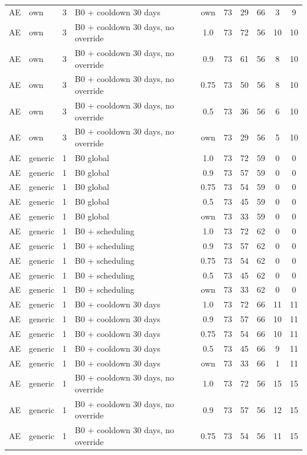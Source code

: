 \documentclass[10pt,onecolumn,letterpaper]{article}
\begin{document}
\begin{longtable}{lllp{4.4cm}cccccc}
AE & own & 3 & B0 + cooldown 30 days & own & 73 & 29 & 66 & 3 & 9 \\
AE & own & 3 & B0 + cooldown 30 days, no override & 1.0 & 73 & 72 & 56 & 10 & 10 \\
AE & own & 3 & B0 + cooldown 30 days, no override & 0.9 & 73 & 61 & 56 & 8 & 10 \\
AE & own & 3 & B0 + cooldown 30 days, no override & 0.75 & 73 & 50 & 56 & 8 & 10 \\
AE & own & 3 & B0 + cooldown 30 days, no override & 0.5 & 73 & 36 & 56 & 6 & 10 \\
AE & own & 3 & B0 + cooldown 30 days, no override & own & 73 & 29 & 56 & 5 & 10 \\
AE & generic & 1 & B0 global & 1.0 & 73 & 72 & 59 & 0 & 0 \\
AE & generic & 1 & B0 global & 0.9 & 73 & 57 & 59 & 0 & 0 \\
AE & generic & 1 & B0 global & 0.75 & 73 & 54 & 59 & 0 & 0 \\
AE & generic & 1 & B0 global & 0.5 & 73 & 45 & 59 & 0 & 0 \\
AE & generic & 1 & B0 global & own & 73 & 33 & 59 & 0 & 0 \\
AE & generic & 1 & B0 + scheduling & 1.0 & 73 & 72 & 62 & 0 & 0 \\
AE & generic & 1 & B0 + scheduling & 0.9 & 73 & 57 & 62 & 0 & 0 \\
AE & generic & 1 & B0 + scheduling & 0.75 & 73 & 54 & 62 & 0 & 0 \\
AE & generic & 1 & B0 + scheduling & 0.5 & 73 & 45 & 62 & 0 & 0 \\
AE & generic & 1 & B0 + scheduling & own & 73 & 33 & 62 & 0 & 0 \\
AE & generic & 1 & B0 + cooldown 30 days & 1.0 & 73 & 72 & 66 & 11 & 11 \\
AE & generic & 1 & B0 + cooldown 30 days & 0.9 & 73 & 57 & 66 & 10 & 11 \\
AE & generic & 1 & B0 + cooldown 30 days & 0.75 & 73 & 54 & 66 & 10 & 11 \\
AE & generic & 1 & B0 + cooldown 30 days & 0.5 & 73 & 45 & 66 & 9 & 11 \\
AE & generic & 1 & B0 + cooldown 30 days & own & 73 & 33 & 66 & 1 & 11 \\
AE & generic & 1 & B0 + cooldown 30 days, no override & 1.0 & 73 & 72 & 56 & 15 & 15 \\
AE & generic & 1 & B0 + cooldown 30 days, no override & 0.9 & 73 & 57 & 56 & 12 & 15 \\
AE & generic & 1 & B0 + cooldown 30 days, no override & 0.75 & 73 & 54 & 56 & 11 & 15 \\

\end{longtable}
\end{document}
